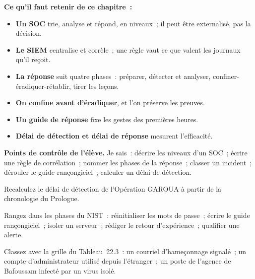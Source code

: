 \begin{boxresume}
\textbf{Ce qu'il faut retenir de ce chapitre~:}
\begin{itemize}
    \item \textbf{Un SOC} trie, analyse et répond, en niveaux~; il peut être
          externalisé, pas la décision.
    \item \textbf{Le SIEM} centralise et corrèle~; une règle vaut ce que
          valent les journaux qu'il reçoit.
    \item \textbf{La réponse} suit quatre phases~: préparer, détecter et
          analyser, confiner-éradiquer-rétablir, tirer les leçons.
    \item \textbf{On confine avant d'éradiquer}, et l'on préserve les
          preuves.
    \item \textbf{Un guide de réponse} fixe les gestes des premières heures.
    \item \textbf{Délai de détection et délai de réponse} mesurent
          l'efficacité.
\end{itemize}
\end{boxresume}

\begin{boxinfo}
\textbf{Points de contrôle de l'élève.} Je sais~: décrire les niveaux d'un
SOC~; écrire une règle de corrélation~; nommer les phases de la réponse~;
classer un incident~; dérouler le guide rançongiciel~; calculer un délai
de détection.
\end{boxinfo}

\bigskip

\begin{boxexo}[title={\ding{45}\quad Exercice~22.1. Le délai \niveaubase}]
Recalculez le délai de détection de l'Opération GAROUA à partir de la
chronologie du Prologue.
\end{boxexo}

\begin{boxexo}[title={\ding{45}\quad Exercice~22.2. Les phases \niveaubase}]
Rangez dans les phases du NIST~: réinitialiser les mots de passe~; écrire
le guide rançongiciel~; isoler un serveur~; rédiger le retour
d'expérience~; qualifier une alerte.
\end{boxexo}

\begin{boxexo}[title={\ding{45}\quad Exercice~22.3. Classer \niveaubase}]
Classez avec la grille du Tableau~22.3~: un courriel d'hameçonnage
signalé~; un compte d'administrateur utilisé depuis l'étranger~; un poste
de l'agence de Bafoussam infecté par un virus isolé.
\end{boxexo}

